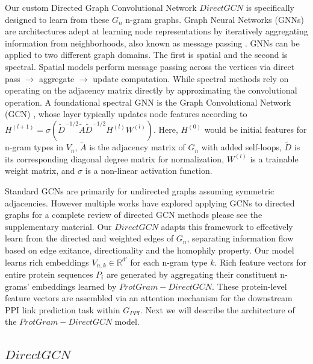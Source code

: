 \documentclass[utf8]{article}
\begin{document}
	Our custom Directed Graph Convolutional Network $DirectGCN$ is specifically designed to learn from these $G_{n}$ n-gram graphs. Graph Neural Networks (GNNs) are architectures adept at learning node representations by iteratively aggregating information from neighborhoods, also known as message passing \cite{scarselli_graphneuralnetwork_2009}. GNNs can be applied to two different graph domains. The first is spatial and the second is spectral. Spatial models perform message passing across the vertices via direct pass $\rightarrow$ aggregate $\rightarrow$ update computation. While spectral methods rely on operating on the adjacency matrix directly by approximating the convolutional operation. A foundational spectral GNN is the Graph Convolutional Network (GCN) \cite{kipf_semisupervisedclassificationgraph_2017}, whose layer typically updates node features according to $H^{(l+1)} = \sigma\left(\tilde{D}^{-1/2} \tilde{A} \tilde{D}^{-1/2} H^{(l)} W^{(l)}\right)$. Here, $H^{(0)}$ would be initial features for n-gram types in $V_{n}$, $\tilde{A}$ is the adjacency matrix of $G_{n}$ with added self-loops, $\tilde{D}$ is its corresponding diagonal degree matrix for normalization, $W^{(l)}$ is a trainable weight matrix, and $\sigma$ is a non-linear activation function.
	
	Standard GCNs are primarily for undirected graphs assuming symmetric adjacencies. However multiple works have explored applying GCNs to directed graphs for a complete review of directed GCN methods please see the supplementary material. Our $DirectGCN$ adapts this framework to effectively learn from the directed and weighted edges of $G_{n}$, separating information flow based on edge exitance, directionality and the homophily property. Our model learns rich embeddings $V_{n,k} \in \mathbb{R}^{d'}$ for each n-gram type $k$. Rich feature vectors for entire protein sequences $P_i$ are generated by aggregating their constituent n-grams' embeddings learned by $ProtGram-DirectGCN$. These protein-level feature vectors are assembled via an attention mechanism for the downstream PPI link prediction task within $G_{PPI}$. Next we will describe the architecture of the $ProtGram-DirectGCN$ model.
	
	\subsection{$DirectGCN$}
\end{document}

